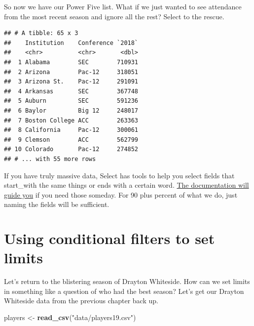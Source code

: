 \documentclass[]{book}
\newenvironment{Shaded}{\begin{snugshade}}{\end{snugshade}}
\newcommand{\KeywordTok}[1]{\textcolor[rgb]{0.13,0.29,0.53}{\textbf{#1}}}
\newcommand{\DataTypeTok}[1]{\textcolor[rgb]{0.13,0.29,0.53}{#1}}
\newcommand{\StringTok}[1]{\textcolor[rgb]{0.31,0.60,0.02}{#1}}
\newcommand{\OperatorTok}[1]{\textcolor[rgb]{0.81,0.36,0.00}{\textbf{#1}}}
\newcommand{\NormalTok}[1]{#1}
\begin{document}
So now we have our Power Five list. What if we just wanted to see
attendance from the most recent season and ignore all the rest? Select
to the rescue.

\begin{Shaded}
\end{Shaded}

\begin{verbatim}
## # A tibble: 65 x 3
##    Institution    Conference `2018`
##    <chr>          <chr>       <dbl>
##  1 Alabama        SEC        710931
##  2 Arizona        Pac-12     318051
##  3 Arizona St.    Pac-12     291091
##  4 Arkansas       SEC        367748
##  5 Auburn         SEC        591236
##  6 Baylor         Big 12     248017
##  7 Boston College ACC        263363
##  8 California     Pac-12     300061
##  9 Clemson        ACC        562799
## 10 Colorado       Pac-12     274852
## # ... with 55 more rows
\end{verbatim}

If you have truly massive data, Select has tools to help you select
fields that start\_with the same things or ends with a certain word.
\href{https://dplyr.tidyverse.org/reference/select.html}{The
documentation will guide you} if you need those someday. For 90 plus
percent of what we do, just naming the fields will be sufficient.

\section{Using conditional filters to set
limits}\label{using-conditional-filters-to-set-limits}

Let's return to the blistering season of Drayton Whiteside. How can we
set limits in something like a question of who had the best season?
Let's get our Drayton Whiteside data from the previous chapter back up.

\begin{Shaded}
\begin{Highlighting}[]
\NormalTok{players <-}\StringTok{ }\KeywordTok{read_csv}\NormalTok{(}\StringTok{"data/players19.csv"}\NormalTok{)}
\end{Highlighting}
\end{Shaded}
\end{document}
